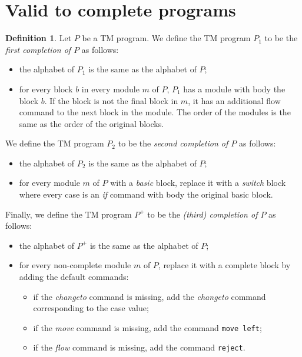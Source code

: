 \documentclass{amsart}
\theoremstyle{definition}
\newtheorem{definition}[theorem]{Definition}
\begin{document}
    \section{Valid to complete programs}
    \begin{definition}
        Let $P$ be a TM program. We define the TM program $P_1$ to be the \emph{first completion of $P$} as follows:
        \begin{itemize}
            \item the alphabet of $P_1$ is the same as the alphabet of $P$;
            \item for every block $b$ in every module $m$ of $P$, $P_1$ has a module with body the block $b$. If the block is not the final block in $m$, it has an additional flow command to the next block in the module. The order of the modules is the same as the order of the original blocks.
        \end{itemize}
        We define the TM program $P_2$ to be the \emph{second completion of $P$} as follows:
        \begin{itemize}
            \item the alphabet of $P_2$ is the same as the alphabet of $P$;
            \item for every module $m$ of $P$ with a \textit{basic} block, replace it with a \textit{switch} block where every case is an \textit{if} command with body the original basic block.
        \end{itemize}
        Finally, we define the TM program $P^+$ to be the \emph{(third) completion of $P$} as follows:
        \begin{itemize}
            \item the alphabet of $P^+$ is the same as the alphabet of $P$;
            \item for every non-complete module $m$ of $P$, replace it with a complete block by adding the default commands:
            \begin{itemize}
                \item if the \textit{changeto} command is missing, add the \textit{changeto} command corresponding to the case value;
                \item if the \textit{move} command is missing, add the command \texttt{move left};
                \item if the \textit{flow} command is missing, add the command \texttt{reject}.
            \end{itemize}
        \end{itemize}
    \end{definition}
\end{document}
